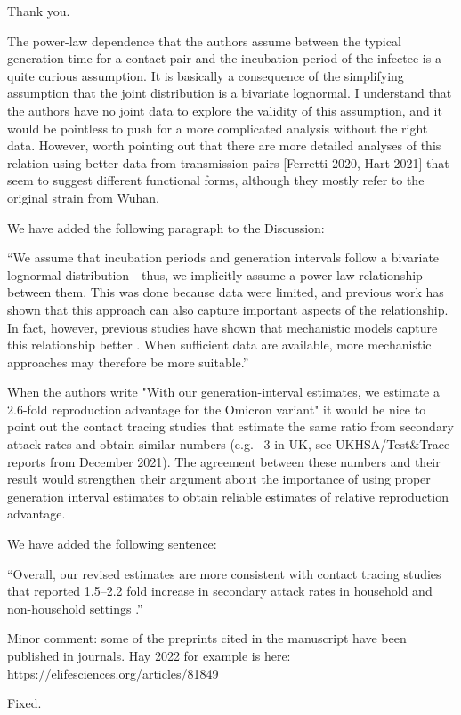 \documentclass[12pt]{article}
\newcommand{\revtext}{\textsf}
\begin{document}
Thank you.

\revtext{The power-law dependence that the authors assume between the typical generation time for a contact pair and the incubation period of the infectee is a quite curious assumption. It is basically a consequence of the simplifying assumption that the joint distribution is a bivariate lognormal. I understand that the authors have no joint data to explore the validity of this assumption, and it would be pointless to push for a more complicated analysis without the right data. However, worth pointing out that there are more detailed analyses of this relation using better data from transmission pairs [Ferretti 2020, Hart 2021] that seem to suggest different functional forms, although they mostly refer to the original strain from Wuhan.}

We have added the following paragraph to the Discussion:

``We assume that incubation periods and generation intervals follow a bivariate lognormal distribution---thus, we implicitly assume a power-law relationship between them. 
This was done because data were limited, and previous work \cite{sender2021unmitigated} has shown that this approach can also capture important aspects of the relationship.
In fact, however, previous studies have shown that mechanistic models capture this relationship better \citep{ferretti2020timing,hart2021}. 
When sufficient data are available, more mechanistic approaches may therefore be more suitable.''

\revtext{When the authors write 
"With our generation-interval estimates, we estimate a 2.6-fold reproduction advantage for the Omicron variant" 
it would be nice to point out the contact tracing studies that estimate the same ratio from secondary attack rates and obtain similar numbers (e.g. ~3 in UK, see UKHSA/Test\&Trace reports from December 2021). The agreement between these numbers and their result would strengthen their argument about the importance of using proper generation interval estimates to obtain reliable estimates of relative reproduction advantage.}

We have added the following sentence: 

``Overall, our revised estimates are more consistent with contact tracing studies that reported 1.5--2.2 fold increase in secondary attack rates in household and non-household settings \citep{allen2022comparative,del2022secondary}.''

\revtext{Minor comment: some of the preprints cited in the manuscript have been published in journals. Hay 2022 for example is here: https://elifesciences.org/articles/81849}

Fixed.


\end{document}
